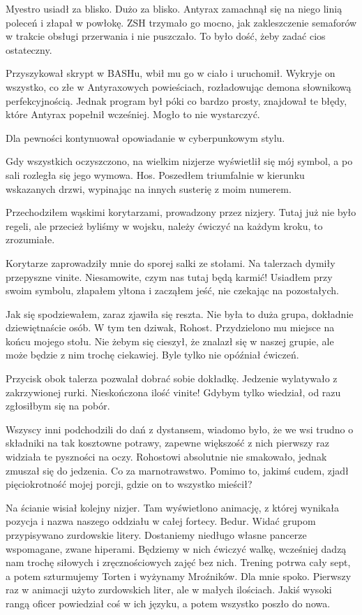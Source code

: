 \divider{}

Myestro usiadł za blisko.
Dużo za blisko.
Antyrax zamachnął się na niego linią poleceń i złapał w powłokę.
ZSH trzymało go mocno, jak zakleszczenie semaforów w trakcie obsługi przerwania i nie puszczało.
To było dość, żeby zadać cios ostateczny.

Przyszykował skrypt w BASHu, wbił mu go w ciało i uruchomił.
Wykryje on wszystko, co złe w Antyraxowych powieściach, rozładowując demona słownikową perfekcyjnością.
Jednak program był póki co bardzo prosty, znajdował te błędy, które Antyrax popełnił wcześniej.
Mogło to nie wystarczyć.

Dla pewności kontynuował opowiadanie w cyberpunkowym stylu.

\divider{}

Gdy wszystkich oczyszczono, na wielkim nizjerze wyświetlił się mój symbol, a po sali rozległa się jego wymowa.
Hos.
Poszedłem triumfalnie w kierunku wskazanych drzwi, wypinając na innych susterię z moim numerem.

Przechodziłem wąskimi korytarzami, prowadzony przez nizjery. 
Tutaj już nie było regeli, ale przecież byliśmy w wojsku, należy ćwiczyć na każdym kroku, to zrozumiałe.

Korytarze zaprowadziły mnie do sporej salki ze stołami.
Na talerzach dymiły przepyszne vinite.
Niesamowite, czym nas tutaj będą karmić!
Usiadłem przy swoim symbolu, złapałem yltona i zacząłem jeść, nie czekając na pozostałych.

Jak się spodziewałem, zaraz zjawiła się reszta.
Nie była to duża grupa, dokładnie dziewiętnaście osób.
W tym ten dziwak, Rohost.
Przydzielono mu miejsce na końcu mojego stołu.
Nie żebym się cieszył, że znalazł się w naszej grupie, ale może będzie z nim trochę ciekawiej.
Byle tylko nie opóźniał ćwiczeń.

Przycisk obok talerza pozwalał dobrać sobie dokładkę.
Jedzenie wylatywało z zakrzywionej rurki.
Nieskończona ilość vinite! Gdybym tylko wiedział, od razu zgłosiłbym się na pobór.

Wszyscy inni podchodzili do dań z dystansem, wiadomo było, że we wsi trudno o składniki na tak kosztowne potrawy, zapewne większość z nich pierwszy raz widziała te pyszności na oczy.
Rohostowi absolutnie nie smakowało, jednak zmuszał się do jedzenia.
Co za marnotrawstwo.
Pomimo to, jakimś cudem, zjadł pięciokrotność mojej porcji, gdzie on to wszystko mieścił?

Na ścianie wisiał kolejny nizjer.
Tam wyświetlono animację, z której wynikała pozycja i nazwa naszego oddziału w całej fortecy. Bedur. Widać grupom przypisywano zurdowskie litery.
Dostaniemy niedługo własne pancerze wspomagane, zwane hiperami.
Będziemy w nich ćwiczyć walkę, wcześniej dadzą nam trochę siłowych i zręcznościowych zajęć bez nich.
Trening potrwa cały sept, a potem szturmujemy Torten i wyżynamy Mroźników.
Dla mnie spoko.
Pierwszy raz w animacji użyto zurdowskich liter, ale w małych ilościach.
Jakiś wysoki rangą oficer powiedział coś w ich języku, a potem wszystko poszło do nowa.

